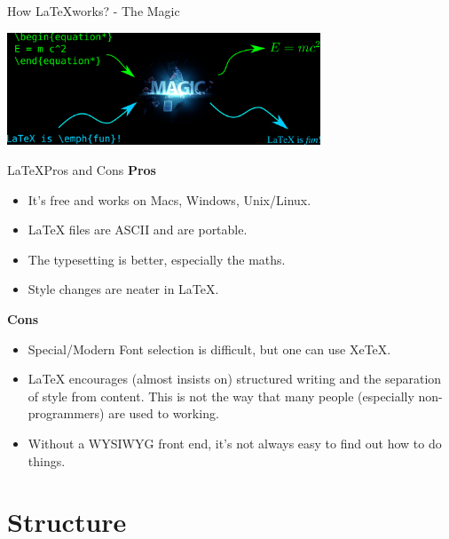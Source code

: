 \documentclass[10pt,times]{beamer}
\begin{document}
\begin{frame}{How \LaTeX works? - The Magic}

\centering
\includegraphics[width=0.7\textwidth]{figs/magic.png}
\end{frame}



\begin{frame}{\LaTeX Pros and Cons}
\textbf{Pros}
\begin{itemize}
\item    It's free and works on Macs, Windows, Unix/Linux.
\item    LaTeX files are ASCII and are portable.
\item    The typesetting is better, especially the maths.
\item    Style changes are neater in LaTeX. 
\end{itemize}
\textbf{Cons}
\begin{itemize}
\item    Special/Modern Font selection is difficult, but one can use XeTeX.
\item    LaTeX encourages (almost insists on) structured writing and the 
separation of style from content. This is not the way that many people 
(especially non-programmers) are used to working.
\item    Without a WYSIWYG front end, it's not always easy to find out how to 
do things.
\end{itemize}
\end{frame}



\section{Structure}

\end{document}
